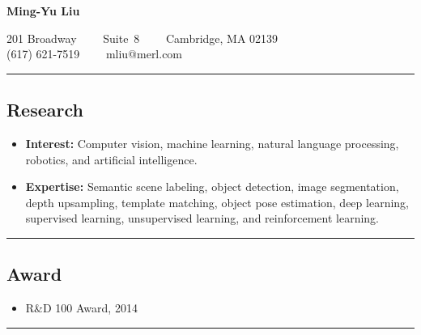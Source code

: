 \documentclass[10pt,letterpaper]{article}
\begin{document}
\begin{center}
{\LARGE \textbf{Ming-Yu Liu}}

201 Broadway\ \ \textbullet
\ \ Suite\ 8\ \ \textbullet
\ \ Cambridge, MA 02139
\\
(617) 621-7519\ \ \textbullet
\ \ mliu@merl.com
\end{center}

\hrule
\vspace{-0.4em}
\subsection*{Research}
\begin{itemize}
\item {\bf Interest:} Computer vision, machine learning, natural language processing, robotics, and artificial intelligence.\vspace{-2mm}
\item {\bf Expertise:} Semantic scene labeling, object detection, image segmentation, depth upsampling, template matching, object pose estimation, deep learning, supervised learning, unsupervised learning, and reinforcement learning.\vspace{-2mm}
\end{itemize}

\hrule
\vspace{-0.4em}
\subsection*{Award}
\begin{itemize}
\item R\&D 100 Award, 2014 
\end{itemize}

\hrule
\vspace{-0.4em}
\end{document}
